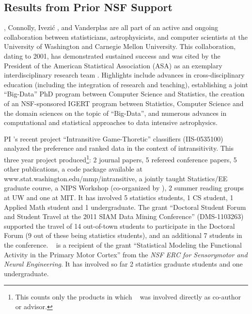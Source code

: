 \subsection{             Results from Prior NSF Support             }
\label{sec:priorNSF}

\meila, Connolly, Ivezi\'{c} , and Vanderplas are all part of an active
and ongoing collaboration between statisticians, astrophysicists, and
computer scientists at the University of Washington and Carnegie
Mellon University.  This collaboration, dating to 2001, has
demonstrated sustained success and was cited by the President of the
American Statistical Association (ASA) as an exemplary
interdisciplinary research team \cite{straf03}. Highlights
include advances in cross-disciplinary education
(including the integration of research and teaching), establishing a
joint ``Big-Data'' PhD program between Computer Science and
Statistics, the creation of an NSF-sponsored IGERT program between
Statistics, Computer Science and the domain sciences on the topic of
``Big-Data'', and numerous advances in computational and statistical
approaches to data intensive astrophysics.

PI \meila's recent project ``Intransitive Game-Thoretic'' classifiers
(IIS-0535100) analyzed the preference and ranked data in the context
of intransitivity. This three year project produced\footnote{This
  counts only the products in which \meila~ was involved directly as
  co-author or advisor.}: 2 journal papers, 5 refereed conference
papers, 5 other publications, a code package available at
{www.stat.washington.edu/mmp/intransitive}, a jointly taught
Statistics/EE graduate course, a NIPS Workshop (co-organized by
\meila), 2 summer reading groups at UW and one at MIT. It has involved
5 statistics students, 1 CS student, 1 Applied Math student and 1
undergraduate. The grant ``Doctoral Student Forum and Student Travel
at the 2011 SIAM Data Mining Conference'' (DMS-1103263) supported the
travel of 14 out-of-town students to participate in the Doctoral Forum
(9 out of these being statistics students), and an additional 7
students in the conference. 
\meila~ is a recipient of the grant ``Statistical Modeling the
Functional Activity in the Primary Motor Cortex'' from the {\em NSF
  ERC for Sensorymotor and Neural Engineering}. It has involved so far 2 statistics graduate students and one
undergraduate.

